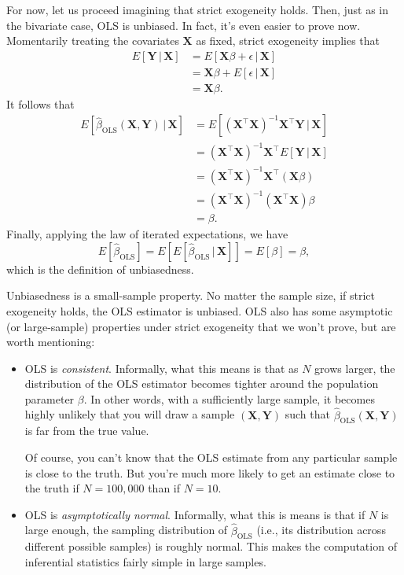 \documentclass[
  12pt,
  oneside,openany]{book}
\begin{document}
For now, let us proceed imagining that strict exogeneity holds. Then, just as in the bivariate case, OLS is unbiased. In fact, it's even easier to prove now. Momentarily treating the covariates \(\mathbf{X}\) as fixed, strict exogeneity implies that
\[
\begin{aligned}
E[\mathbf{Y} \,|\, \mathbf{X}]
&= E[\mathbf{X} \beta + \epsilon \,|\, \mathbf{X}] \\
&= \mathbf{X} \beta + E[\epsilon \,|\, \mathbf{X}] \\
&= \mathbf{X} \beta.
\end{aligned}
\]
It follows that
\[
\begin{aligned}
E[\hat{\beta}_{\text{OLS}}(\mathbf{X}, \mathbf{Y}) \,|\, \mathbf{X}]
&= E[(\mathbf{X}^\top \mathbf{X})^{-1} \mathbf{X}^\top \mathbf{Y} \,|\, \mathbf{X}] \\
&= (\mathbf{X}^\top \mathbf{X})^{-1} \mathbf{X}^\top E[\mathbf{Y} \,|\, \mathbf{X}] \\
&= (\mathbf{X}^\top \mathbf{X})^{-1} \mathbf{X}^\top (\mathbf{X} \beta) \\
&= (\mathbf{X}^\top \mathbf{X})^{-1} (\mathbf{X}^\top \mathbf{X}) \beta \\
&= \beta.
\end{aligned}
\]
Finally, applying the law of iterated expectations, we have
\[
E[\hat{\beta}_{\text{OLS}}] = E [ E[\hat{\beta}_{\text{OLS}} \,|\, \mathbf{X}] ] = E [ \beta ] = \beta,
\]
which is the definition of unbiasedness.

Unbiasedness is a small-sample property. No matter the sample size, if strict exogeneity holds, the OLS estimator is unbiased. OLS also has some asymptotic (or large-sample) properties under strict exogeneity that we won't prove, but are worth mentioning:

\begin{itemize}
\item
  OLS is \emph{consistent}. Informally, what this means is that as \(N\) grows larger, the distribution of the OLS estimator becomes tighter around the population parameter \(\beta\). In other words, with a sufficiently large sample, it becomes highly unlikely that you will draw a sample \((\mathbf{X}, \mathbf{Y})\) such that \(\hat{\beta}_{\text{OLS}}(\mathbf{X}, \mathbf{Y})\) is far from the true value.

  Of course, you can't know that the OLS estimate from any particular sample is close to the truth. But you're much more likely to get an estimate close to the truth if \(N = 100{,}000\) than if \(N = 10\).
\item
  OLS is \emph{asymptotically normal}. Informally, what this is means is that if \(N\) is large enough, the sampling distribution of \(\hat{\beta}_{\text{OLS}}\) (i.e., its distribution across different possible samples) is roughly normal. This makes the computation of inferential statistics fairly simple in large samples.
\end{itemize}
\end{document}

